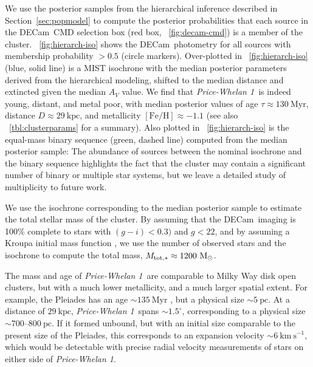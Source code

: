 \documentclass[twocolumn]{aastex62}
\newcommand{\acronym}[1]{{\small{#1}}}
\newcommand{\decam}{DECam}
\newcommand{\sectionname}{Section}
\newcommand{\msun}{\textrm{M}_\odot}
\newcommand{\kms}{\ensuremath{\textrm{km}~\textrm{s}^{-1}}}
\newcommand{\feh}{\ensuremath{[\textrm{Fe} / \textrm{H}]}}
\newcommand{\clustername}{\textsl{Price-Whelan 1}}
\newcommand{\clage}{\ensuremath{130~\textrm{Myr}}}
\newcommand{\clfeh}{\ensuremath{-1.1}}
\newcommand{\cldist}{\ensuremath{29~\textrm{kpc}}}
\begin{document}
We use the posterior samples from the hierarchical inference described in \sectionname~\ref{sec:popmodel} to compute the posterior probabilities that each source in the \decam\ CMD selection box (red box, \figurename~\ref{fig:decam-cmd}) is a member of the cluster.
\figurename~\ref{fig:hierarch-iso} shows the \decam\ photometry for all sources with membership probability $> 0.5$ (circle markers).
Over-plotted in \figurename~\ref{fig:hierarch-iso} (blue, solid line) is a \acronym{MIST} isochrone with the median posterior parameters derived from the hierarchical modeling, shifted to the median distance and extincted given the median $A_V$ value.
We find that \clustername\ is indeed young, distant, and metal poor, with median posterior values of age $\tau \approx \clage$, distance $D \approx \cldist$, and metallicity $\feh \approx \clfeh$ (see also \tablename~\ref{tbl:clusterparams} for a summary).
Also plotted in \figurename~\ref{fig:hierarch-iso} is the equal-mass binary sequence (green, dashed line) computed from the median posterior sample: The abundance of sources between the nominal isochrone and the binary sequence highlights the fact that the cluster may contain a significant number of binary or multiple star systems, but we leave a detailed study of multiplicity to future work.

We use the isochrone corresponding to the median posterior sample to estimate the total stellar mass of the cluster.
By assuming that the \decam\ imaging is 100\% complete to stars with $(g-i) < 0.3)$ and $g < 22$, and by assuming a Kroupa initial mass function \citep{Kroupa:2001}, we use the number of observed stars and the isochrone to compute the total mass, $M_{\rm tot, *} \approx 1200~\msun$.

The mass and age of \clustername\ are comparable to Milky Way disk open clusters, but with a much lower metallicity, and a much larger spatial extent.
For example, the Pleiades has an age $\sim 135~\textrm{Myr}$ \citep{Gossage:2018}, but a physical size $\sim 5~\textrm{pc}$.
At a distance of $\cldist$, \clustername\ spans $\sim 1.5^\circ$, corresponding to a physical size $\sim 700$--$800~\textrm{pc}$.
If it formed unbound, but with an initial size comparable to the present size of the Pleiades, this corresponds to an expansion velocity $\sim 6~\kms$, which would be detectable with precise radial velocity measurements of stars on either side of \clustername.
\end{document}
